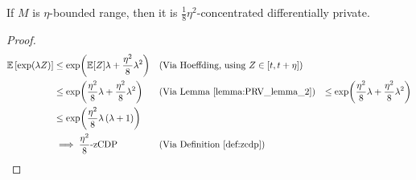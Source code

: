 \documentclass{article}
\begin{document}
\begin{theorem}
    If $M$ is $\eta$-bounded range, then it is $\frac{1}{8}\eta^{2}$-concentrated differentially private.
\end{theorem}

\begin{proof}
\begin{align}
    \mathbb{E}\left[\exp(\lambda Z)\right]
    & \leq \exp(\mathbb{E}[Z] \lambda + \frac{\eta^2}{8} \lambda^2) && (\text{Via Hoeffding, using } Z \in [t, t+\eta]) \\
    & \leq \exp(\frac{\eta^2}{8} \lambda + \frac{\eta^2}{8} \lambda^2) && (\text{Via Lemma \ref{lemma:PRV_lemma_2}})
    & \leq \exp(\frac{\eta^2}{8} \lambda + \frac{\eta^2}{8} \lambda^2) \\
    & \leq \exp(\frac{\eta^2}{8} \lambda \left( \lambda + 1\right)) \\
    & \implies \frac{\eta^2}{8}\text{-zCDP} && (\text{Via Definition \ref{def:zcdp}})
\end{align}
\end{proof}
\end{document}

